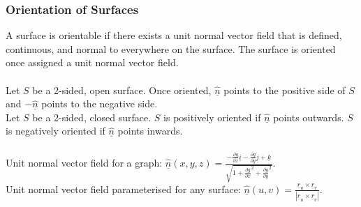 \documentclass{article}
\begin{document}
			\subsubsection{Orientation of Surfaces}
				A surface is orientable if there exists a unit normal vector field that is defined, continuous, and normal to everywhere on the surface. The surface is oriented once assigned a unit normal vector field. \\
				\\
				Let $S$ be a 2-sided, open surface. Once oriented, $\underline{\hat{n}}$ points to the positive side of $S$ and $-\underline{\hat{n}}$ points to the negative side. \\
				Let $S$ be a 2-sided, closed surface. $S$ is positively oriented if $\underline{\hat{n}}$ points outwards. $S$ is negatively oriented if $\underline{\hat{n}}$ points inwards. \\
				\\
				Unit normal vector field for a graph: $\underline{\hat{n}}(x,y,z) = \frac{-\frac{\partial g}{\partial x}\underline{i} - \frac{\partial g}{\partial y}\underline{j} + \underline{k}}{\sqrt{1 + \frac{\partial g}{\partial x}^2 + \frac{\partial g}{\partial y}^2}}$. \\
				Unit normal vector field parameterised for any surface: $\underline{\hat{n}}(u,v) = \frac{\underline{r}_{u} \times \underline{r}_{v}}{|\underline{r}_u \times \underline{r}_v|}$. \\
	
\end{document}
